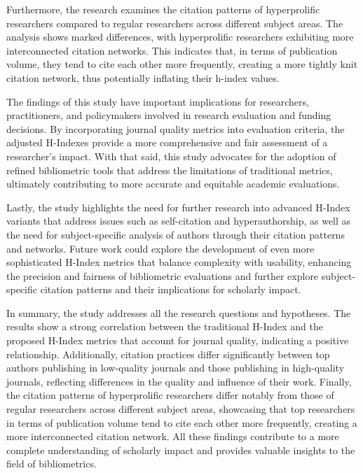 Furthermore, the research examines the citation patterns of hyperprolific
researchers compared to regular researchers across different subject areas. The
analysis shows marked differences, with hyperprolific researchers exhibiting
more interconnected citation networks. This indicates that, in terms of
publication volume, they tend to cite each other more frequently, creating a
more tightly knit citation network, thus potentially inflating their h-index
values.

The findings of this study have important implications for researchers,
practitioners, and policymakers involved in research evaluation and funding
decisions. By incorporating journal quality metrics into evaluation criteria,
the adjusted H-Indexes provide a more comprehensive and fair assessment of a
researcher’s impact. With that said, this study advocates for the adoption of
refined bibliometric tools that address the limitations of traditional metrics,
ultimately contributing to more accurate and equitable academic evaluations.

Lastly, the study highlights the need for further research into advanced
H-Index variants that address issues such as self-citation and hyperauthorship,
as well as the need for subject-specific analysis of authors through their
citation patterns and networks. Future work could explore the development of
even more sophisticated H-Index metrics that balance complexity with usability,
enhancing the precision and fairness of bibliometric evaluations and further
explore subject-specific citation patterns and their implications for scholarly
impact.

In summary, the study addresses all the research questions and hypotheses. The
results show a strong correlation between the traditional H-Index and the
proposed H-Index metrics that account for journal quality, indicating a
positive relationship. Additionally, citation practices differ significantly
between top authors publishing in low-quality journals and those publishing in
high-quality journals, reflecting differences in the quality and influence of
their work. Finally, the citation patterns of hyperprolific researchers differ
notably from those of regular researchers across different subject areas,
showcasing that top researchers in terms of publication volume tend to cite
each other more frequently, creating a more interconnected citation network.
All these findings contribute to a more complete understanding of scholarly
impact and provides valuable insights to the field of bibliometrics.

